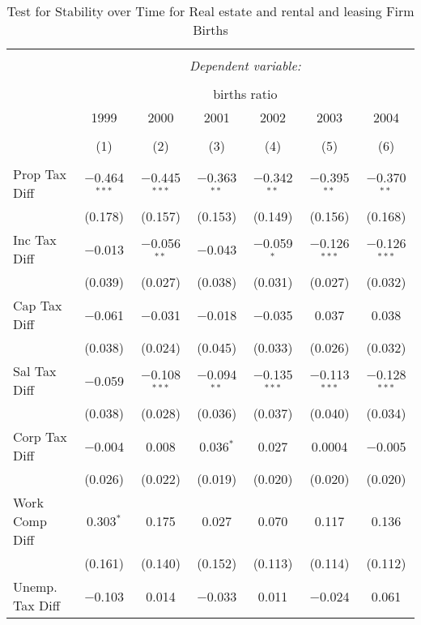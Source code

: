 
\begin{table}[!htbp] \centering 
  \caption{Test for Stability over Time for  Real estate and rental and leasing Firm Births} 
  \label{53year} 
\small 
\begin{tabular}{@{\extracolsep{5pt}}lcccccc} 
\\[-1.8ex]\hline 
\hline \\[-1.8ex] 
 & \multicolumn{6}{c}{\textit{Dependent variable:}} \\ 
\cline{2-7} 
\\[-1.8ex] & \multicolumn{6}{c}{births ratio} \\ 
 & 1999 & 2000 & 2001 & 2002 & 2003 & 2004 \\ 
\\[-1.8ex] & (1) & (2) & (3) & (4) & (5) & (6)\\ 
\hline \\[-1.8ex] 
 Prop Tax Diff & $-$0.464$^{***}$ & $-$0.445$^{***}$ & $-$0.363$^{**}$ & $-$0.342$^{**}$ & $-$0.395$^{**}$ & $-$0.370$^{**}$ \\ 
  & (0.178) & (0.157) & (0.153) & (0.149) & (0.156) & (0.168) \\ 
  Inc Tax Diff & $-$0.013 & $-$0.056$^{**}$ & $-$0.043 & $-$0.059$^{*}$ & $-$0.126$^{***}$ & $-$0.126$^{***}$ \\ 
  & (0.039) & (0.027) & (0.038) & (0.031) & (0.027) & (0.032) \\ 
  Cap Tax Diff & $-$0.061 & $-$0.031 & $-$0.018 & $-$0.035 & 0.037 & 0.038 \\ 
  & (0.038) & (0.024) & (0.045) & (0.033) & (0.026) & (0.032) \\ 
  Sal Tax Diff & $-$0.059 & $-$0.108$^{***}$ & $-$0.094$^{**}$ & $-$0.135$^{***}$ & $-$0.113$^{***}$ & $-$0.128$^{***}$ \\ 
  & (0.038) & (0.028) & (0.036) & (0.037) & (0.040) & (0.034) \\ 
  Corp Tax Diff & $-$0.004 & 0.008 & 0.036$^{*}$ & 0.027 & 0.0004 & $-$0.005 \\ 
  & (0.026) & (0.022) & (0.019) & (0.020) & (0.020) & (0.020) \\ 
  Work Comp Diff & 0.303$^{*}$ & 0.175 & 0.027 & 0.070 & 0.117 & 0.136 \\ 
  & (0.161) & (0.140) & (0.152) & (0.113) & (0.114) & (0.112) \\ 
  Unemp. Tax Diff & $-$0.103 & 0.014 & $-$0.033 & 0.011 & $-$0.024 & 0.061 \\ 

\end{tabular}
\end{table}
